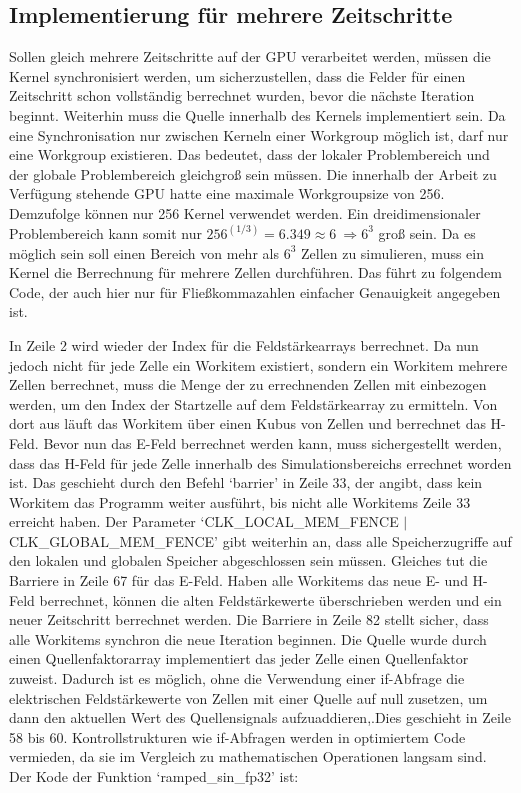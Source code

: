 \documentclass[11pt, ngerman]{article}
\begin{document}
\subsection{Implementierung f\"ur mehrere Zeitschritte}
Sollen gleich mehrere Zeitschritte auf der GPU verarbeitet werden, m\"ussen die Kernel synchronisiert
werden, um sicherzustellen, dass die Felder f\"ur einen Zeitschritt schon vollst\"andig berrechnet
wurden, bevor die n\"achste Iteration beginnt. Weiterhin muss die Quelle innerhalb des Kernels
implementiert sein. Da eine Synchronisation nur zwischen Kerneln
einer Workgroup m\"oglich ist, darf nur eine Workgroup existieren. Das bedeutet, dass der lokaler
Problembereich und der globale Problembereich gleichgro{\ss} sein m\"ussen.
Die innerhalb der Arbeit zu Verf\"ugung stehende GPU hatte eine maximale Workgroupsize von 256.
Demzufolge k\"onnen nur 256 Kernel verwendet werden. Ein dreidimensionaler
Problembereich kann somit nur \(256^{(1/3)} = 6.349 \approx 6\ \Rightarrow 6^3\)
gro{\ss} sein. Da es m\"oglich sein soll einen Bereich von mehr als \(6^3\) Zellen zu simulieren,
muss ein Kernel die Berrechnung f\"ur mehrere Zellen durchf\"uhren.
Das f\"uhrt zu folgendem Code, der auch hier nur f\"ur Flie{\ss}kommazahlen einfacher
Genauigkeit angegeben ist.


In Zeile 2 wird wieder der Index f\"ur die Feldst\"arkearrays berrechnet.
Da nun jedoch nicht f\"ur jede Zelle ein Workitem existiert, sondern ein
Workitem mehrere Zellen berrechnet, muss die Menge der zu errechnenden
Zellen mit einbezogen werden, um den Index der Startzelle auf dem
Feldst\"arkearray zu ermitteln.
Von dort aus l\"auft das Workitem \"uber einen Kubus von Zellen und berrechnet
das H-Feld. Bevor nun das E-Feld berrechnet werden kann, muss sichergestellt
werden, dass das H-Feld f\"ur jede Zelle innerhalb des Simulationsbereichs
errechnet worden ist. Das geschieht durch den Befehl `barrier' in Zeile
33, der angibt, dass kein Workitem das Programm weiter ausf\"uhrt, bis
nicht alle Workitems Zeile 33 erreicht haben. Der Parameter
`CLK\_LOCAL\_MEM\_FENCE \(\vert\) CLK\_GLOBAL\_MEM\_FENCE' gibt weiterhin an, dass alle
Speicherzugriffe auf den lokalen und globalen Speicher abgeschlossen sein m\"ussen.
Gleiches tut die Barriere in Zeile 67 f\"ur das E-Feld. Haben alle Workitems das neue E- und H-Feld
berrechnet, k\"onnen die alten Feldst\"arkewerte \"uberschrieben werden und ein
neuer Zeitschritt berrechnet werden. Die Barriere in Zeile 82 stellt sicher,
dass alle Workitems synchron die neue Iteration beginnen.
Die Quelle wurde durch einen Quellenfaktorarray implementiert das jeder Zelle
einen Quellenfaktor zuweist. Dadurch ist es m\"oglich, ohne die Verwendung
einer if-Abfrage die elektrischen Feldst\"arkewerte von Zellen mit einer
Quelle auf null zusetzen, um dann den aktuellen Wert des Quellensignals
aufzuaddieren,.Dies geschieht in Zeile 58 bis 60.
Kontrollstrukturen wie if-Abfragen werden in optimiertem Code vermieden,
da sie im Vergleich zu mathematischen Operationen langsam sind.
Der Kode der Funktion `ramped\_sin\_fp32' ist:
\end{document}
